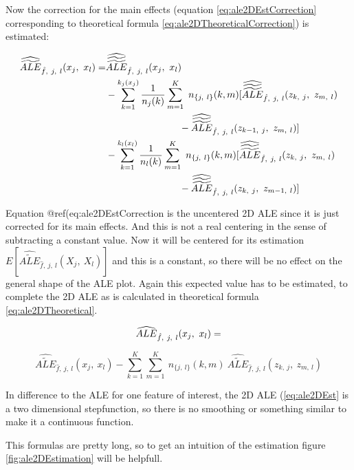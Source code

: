 \documentclass[
]{krantz}
\begin{document}
Now the correction for the main effects (equation \eqref{eq:ale2DEstCorrection} corresponding to theoretical formula \eqref{eq:ale2DTheoreticalCorrection}) is estimated:

\begin{align}
\widehat{\widetilde{ALE}}_{\hat{f},~j,~l}(x_j, ~x_l) = 
&\widehat{\widetilde{\widetilde{ALE}}}_{\hat{f},~j,~l}(x_j, ~x_l) \notag \\
&-  \sum_{k=1}^{k_j(x_j)} \frac{1}{n_j(k)} \sum_{m=1}^{K} ~ n_{\{j,~l\}}(k,m) [\widehat{\widetilde{\widetilde{ALE}}}_{\hat{f},~j,~l}(z_{k,~j}, ~z_{m,~l}) \notag \\
&~~~~~~~~~~~~~~~~~~~~~~~
- \widehat{\widetilde{\widetilde{ALE}}}_{\hat{f},~j,~l}(z_{k-1,~j}, ~z_{m,~l})]\notag \\
&- \sum_{k=1}^{k_l(x_l)} \frac{1}{n_l(k)} \sum_{m=1}^{K} ~ n_{\{j,~l\}}(k,m) [\widehat{\widetilde{\widetilde{ALE}}}_{\hat{f},~j,~l}(z_{k,~j}, ~z_{m,~l}) \notag \\
&~~~~~~~~~~~~~~~~~~~~~~~ 
- \widehat{\widetilde{\widetilde{ALE}}}_{\hat{f},~j,~l}(z_{k,~j}, ~z_{m-1,~l})]
\label{eq:ale2DEstCorrection}
\end{align}

Equation @ref(eq:ale2DEstCorrection is the uncentered 2D ALE since it is just corrected for its main effects. And this is not a real centering in the sense of subtracting a constant value. Now it will be centered for its estimation \(E[\widehat{\widetilde{ALE}}_{\hat{f},~j,~l}(X_j, ~X_l)]\) and this is a constant, so there will be no effect on the general shape of the ALE plot. Again this expected value has to be estimated, to complete the 2D ALE as is calculated in theoretical formula \eqref{eq:ale2DTheoretical}.

\begin{equation}  
\widehat{ALE}_{\hat{f},~j,~l}(x_j, ~x_l) = \notag
\end{equation}

\begin{equation}
\widehat{\widetilde{ALE}}_{\hat{f},~j,~l}(x_j, ~x_l) -
\sum_{k=1}^{K}\sum_{m=1}^{K} ~ n_{\{j,~l\}}(k,m) ~ \widehat{\widetilde{ALE}}_{\hat{f},~j,~l}(z_{k,~j}, ~z_{m,~l}) 
 \label{eq:ale2DEst}
\end{equation}

In difference to the ALE for one feature of interest, the 2D ALE (\eqref{eq:ale2DEst} is a two dimensional stepfunction, so there is no smoothing or something similar to make it a continuous function.

This formulas are pretty long, so to get an intuition of the estimation figure \ref{fig:ale2DEstimation} will be helpfull.
\end{document}
